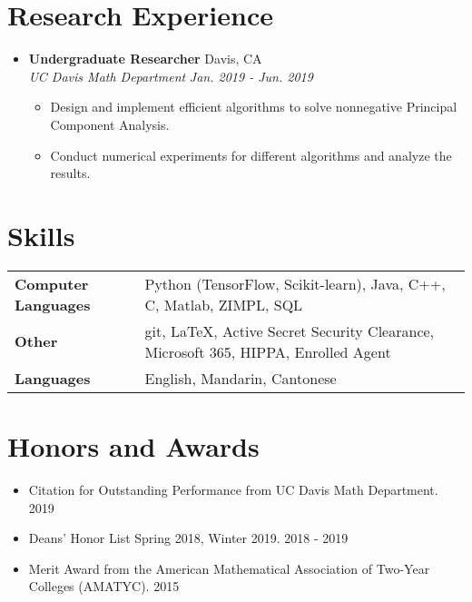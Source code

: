 \documentclass[letterpaper,11pt]{article}
\makeatletter
\newcommand{\resumeItem}[2]{
  \item\small{
    \textbf{#1}{#2 \vspace{-3pt}}
  }
}
\newcommand{\resumeSubheadingtest}[4]{
  \vspace{-1pt}
     \item \textbf{ #1} \hfill \small {#2} \\
      \textit{\small #3} \hfill \textit{\small #4} 
    \vspace{-5pt}
}
\newcommand{\resumeSubItem}[2]{\resumeItem{#1}{#2}\vspace{-1pt}}
\newcommand{\resumeSubHeadingListStart}{\begin{itemize}[leftmargin=*]}
\newcommand{\resumeSubHeadingListEnd}{\end{itemize}}
\newcommand{\resumeItemListStart}{\begin{itemize}}
\newcommand{\resumeItemListEnd}{\end{itemize}\vspace{-5pt}}
\makeatother
\begin{document}
  

\section{\textbf{Research Experience}}
  \resumeSubHeadingListStart

 \resumeSubheadingtest
      {Undergraduate Researcher}
     {Davis, CA}
      {UC Davis Math Department}
     {Jan. 2019 - Jun. 2019}
      \resumeItemListStart
            \resumeItem{}
           {Design and implement efficient algorithms to solve nonnegative Principal Component Analysis. }
        \resumeItem{}
        {Conduct numerical experiments for different algorithms and analyze the results.  }

       
      \resumeItemListEnd
      
  \resumeSubHeadingListEnd

  
 \section{\textbf{Skills}}
\begin{tabular}{@{} >{\bfseries} p{5cm}p{15cm}}

Computer Languages & Python (TensorFlow, Scikit-learn), Java, C++, C, Matlab, ZIMPL, SQL \\
Other & git, \LaTeX, Active Secret Security Clearance, Microsoft 365, HIPPA, Enrolled Agent\\
Languages &  English, Mandarin, Cantonese\\


\end{tabular}
  
\section{\textbf{Honors and Awards}}
\resumeSubHeadingListStart
\resumeSubItem{}
      {Citation for Outstanding Performance from UC Davis Math Department. \hfill 2019}
      \resumeSubItem{}
      {Deans' Honor List Spring 2018, Winter 2019. \hfill 2018 - 2019}
      \resumeSubItem{}
      {Merit Award from the American Mathematical Association of Two-Year Colleges (AMATYC). \hfill 2015}

  \resumeSubHeadingListEnd

%


\end{document}

